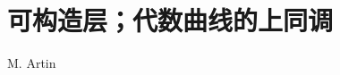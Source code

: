 \setcounter{chapter}{8}
\chapter{可构造层；代数曲线的上同调}
\begin{center}
M. Artin
\end{center}
\label{sga4.exp.IX}


